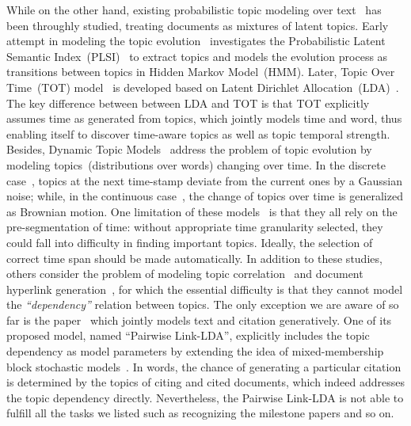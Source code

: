 While on the other hand, existing probabilistic topic modeling over
text~\cite{blei2003latent,griffiths2004finding,hofmann2001unsupervised} has been
throughly studied, treating documents as mixtures of latent topics.  Early
attempt in modeling the topic evolution~\cite{mei2005discovering} investigates
the Probabilistic Latent Semantic Index~(PLSI)~\cite{hofmann2001unsupervised} to
extract topics and models the evolution process as transitions between topics in
Hidden Markov Model~(HMM).  Later, Topic Over Time~(TOT)
model~\cite{wang2006topics} is developed based on Latent Dirichlet
Allocation~(LDA)~\cite{blei2003latent}. The key difference between between LDA
and TOT is that TOT explicitly assumes time as generated from topics, which
jointly models time and word, thus enabling itself to discover time-aware topics
as well as topic temporal strength.  Besides, Dynamic Topic
Models~\cite{blei2006dynamic,wang2012continuous} address the problem of topic
evolution by modeling topics~(distributions over words) changing over time. In
the discrete case~\cite{blei2006dynamic}, topics at the next time-stamp deviate
from the current ones by a Gaussian noise; while, in the continuous
case~\cite{wang2012continuous}, the change of topics over time is generalized as
Brownian motion.  One limitation of these models~\cite{blei2006dynamic,
mei2005discovering,wang2012continuous,wang2006topics} is that they all rely on
the pre-segmentation of time: without appropriate time granularity selected,
they could fall into difficulty in finding important topics. Ideally, the
selection of correct time span should be made automatically.  In addition to
these studies, others consider the problem of modeling topic
correlation~\cite{blei2007correlated} and document hyperlink
generation~\cite{chang2009relational}, for which the essential difficulty is
that they cannot model the \emph{``dependency''} relation between topics. The
only exception we are aware of so far is the paper~\cite{nallapati2008joint}
which jointly models text and citation generatively. One of its proposed model,
named ``Pairwise Link-LDA'', explicitly includes the topic dependency as model
parameters by extending the idea of mixed-membership block stochastic
models~\cite{airoldi2006mixed}. In words, the chance of generating a particular
citation is determined by the topics of citing and cited documents, which indeed
addresses the topic dependency directly. Nevertheless, the Pairwise Link-LDA is
not able to fulfill all the tasks we listed such as recognizing the milestone
papers and so on.


